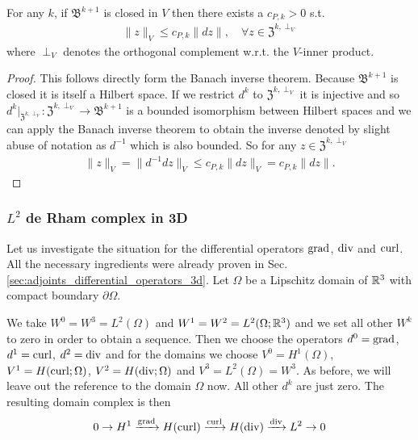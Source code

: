 \documentclass[../master_thesis.tex]{subfiles}
\begin{document}
\begin{theorem} \label{thm:poincare_inequality}
    For any $k$, if $\mathfrak{B}^{k+1}$ is closed in $V$ then there exists a 
    $c_{P,k}>0$ s.t. 
    \begin{align*}
        \lVert z \rVert _V \leq c_{P,k} \lVert dz \rVert, \quad \forall z \in \mathfrak{Z}^{k,\perp_V}
    \end{align*}
    where $\perp_V$ denotes the orthogonal complement w.r.t. the $V$-inner product.
\end{theorem}
\begin{proof}
    This follows directly form the Banach inverse theorem. Because $\mathfrak{B}^{k+1}$ is closed
    it is itself a Hilbert space. If we restrict $d^k$ to $\mathfrak{Z}^{k,\perp_V}$ it 
    is injective and so $d^k|_{\mathfrak{Z}^{k,\perp_V}}:\mathfrak{Z}^{k,\perp_V} 
    \rightarrow \mathfrak{B}^{k+1}$ is a bounded isomorphism between 
    Hilbert spaces and we can apply the Banach inverse theorem to obtain the inverse 
    denoted by slight abuse of notation as $d^{-1}$ which is also bounded. So 
    for any $z \in \mathfrak{Z}^{k,\perp_V}$
    \begin{align*}
        \lVert z \rVert _V = \lVert d^{-1} dz \rVert _V  \leq c_{P,k} \lVert dz \rVert _V 
        = c_{P,k} \lVert dz \rVert.
    \end{align*}
\end{proof}

\subsubsection{$L^2$ de Rham complex in 3D} \label{sec:l2_de_rham_complex_in_3d}
Let us investigate the situation for the differential operators 
$\operatorname{grad}$, $\operatorname{div}$ and $\operatorname{curl}$. All the necessary ingredients were already 
proven in Sec.\,\ref{sec:adjoints_differential_operators_3d}. 
Let $\Omega$ be a Lipschitz domain of 
$\mathbb{R}^3$ with compact boundary $\partial \Omega$. %

We take $W^0 = W^3 = L^2(\Omega)$ and $W^1 = W^2 = L^2(\Omega;\mathbb{R}^3)$ 
and we set all other $W^k$ to zero in order to obtain a sequence.
Then we choose the operators $d^0 = \operatorname{grad}$, $d^1 = \operatorname{curl}$, $d^2 = \operatorname{div}$ and
for the domains we choose $V^0 = H^1(\Omega)$, $V^1 = H(\operatorname{curl};\Omega)$, 
$V^2 = H(\operatorname{div};\Omega)$ and $V^3 = L^2(\Omega) = W^3$. 
As before, we will leave out the reference to the domain $\Omega$ now.
All other 
$d^k$ are just zero. The resulting domain complex is then
\begin{align}
    0 \rightarrow H^1 \xrightarrow{\operatorname{grad}} H(\operatorname{curl})
        \xrightarrow{\operatorname{curl}} H(\operatorname{div}) \xrightarrow{\operatorname{div}} L^2 \rightarrow 0
    \label{eq:primal_de_rham_complex_3d}
\end{align}
\end{document}
